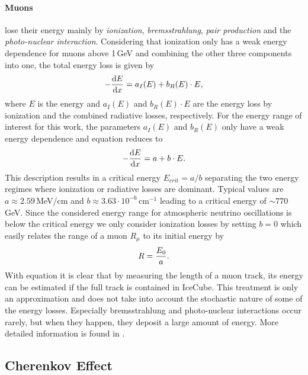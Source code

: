 \paragraph{Muons} lose their energy mainly by \textit{ionization}, \textit{bremsstrahlung}, \textit{pair production} and the \textit{photo-nuclear interaction}.
Considering that ionization only has a weak energy dependence for muons above 1\,GeV and combining the other three components into one, the total energy loss is given by
\begin{equation}
    -\frac{\mathrm{d}E}{\mathrm{d}x} = a_I(E) + b_R(E) \cdot E,
    \labeq{radiative_losses}
\end{equation}
where $E$ is the energy and $a_I(E)$ and $b_R(E) \cdot E$ are the energy loss by ionization and the combined radiative losses, respectively.
For the energy range of interest for this work, the parameters $a_I(E)$ and $b_R(E)$ only have a weak energy dependence and equation  reduces to
\begin{equation}
    -\frac{\mathrm{d}E}{\mathrm{d}x} = a + b \cdot E.
    \labeq{radiative_losses_simple}
\end{equation}
This description results in a critical energy $E_{crit}=a/b$ separating the two energy regimes where ionization or radiative losses are dominant.
Typical values are $a \approx 2.59$\,MeV/cm and $b \approx 3.63 \cdot 10^{-6}$\,cm$^{-1}$  leading to a critical energy of $\sim 770$\,GeV.
Since the considered energy range for atmospheric neutrino oscillations is below the critical energy we only consider ionization losses by setting $b=0$ which easily relates the range of a muon $R_\mu$ to its initial energy by
\begin{equation}
    R = \frac{E_0}{a}.
    \labeq{muon_range_approx}
\end{equation}
With equation  it is clear that by measuring the length of a muon track, its energy can be estimated if the full track is contained in IceCube.
This treatment is only an approximation and does not take into account the stochastic nature of some of the energy losses.
Especially bremsstrahlung and photo-nuclear interactions occur rarely, but when they happen, they deposit a large amount of energy. More detailed information is found in .


\subsection{Cherenkov Effect} 


